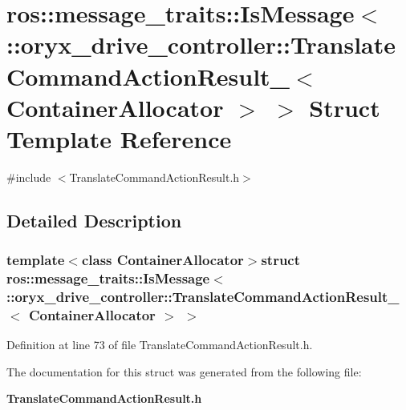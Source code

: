 \section{ros\-:\-:message\-\_\-traits\-:\-:\-Is\-Message$<$ \-:\-:oryx\-\_\-drive\-\_\-controller\-:\-:\-Translate\-Command\-Action\-Result\-\_\-$<$ \-Container\-Allocator $>$ $>$ \-Struct \-Template \-Reference}
\label{structros_1_1message__traits_1_1IsMessage_3_01_1_1oryx__drive__controller_1_1TranslateCommandAct3f485e2d7b33f070810b244d808a876b}


{\ttfamily \#include $<$\-Translate\-Command\-Action\-Result.\-h$>$}



\subsection{\-Detailed \-Description}
\subsubsection*{template$<$class Container\-Allocator$>$struct ros\-::message\-\_\-traits\-::\-Is\-Message$<$ \-::oryx\-\_\-drive\-\_\-controller\-::\-Translate\-Command\-Action\-Result\-\_\-$<$ Container\-Allocator $>$ $>$}



\-Definition at line 73 of file \-Translate\-Command\-Action\-Result.\-h.



\-The documentation for this struct was generated from the following file\-:\begin{DoxyCompactItemize}
\item 
{\bf \-Translate\-Command\-Action\-Result.\-h}\end{DoxyCompactItemize}
